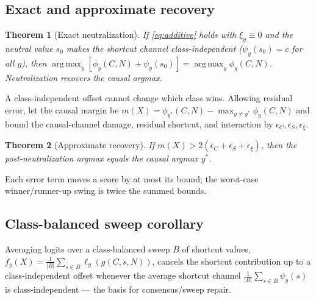 \documentclass[11pt]{article}
\newtheorem{theorem}{Theorem}
\newcommand{\argmax}{\operatorname*{arg\,max}}
\begin{document}
\subsection{Exact and approximate recovery}
\begin{theorem}[Exact neutralization]
If \eqref{eq:additive} holds with $\xi_y\equiv 0$ and the neutral value $s_0$ makes
the shortcut channel class-independent ($\psi_y(s_0)=c$ for all $y$), then
$\argmax_y[\phi_y(C,N)+\psi_y(s_0)] = \argmax_y \phi_y(C,N)$. Neutralization recovers
the causal argmax.
\end{theorem}
A class-independent offset cannot change which class wins. Allowing residual error,
let the causal margin be $m(X)=\phi_{y^*}(C,N)-\max_{y\ne y^*}\phi_y(C,N)$ and bound
the causal-channel damage, residual shortcut, and interaction by
$\epsilon_C,\epsilon_S,\epsilon_\xi$.
\begin{theorem}[Approximate recovery]
If $m(X) > 2(\epsilon_C+\epsilon_S+\epsilon_\xi)$, then the post-neutralization
argmax equals the causal argmax $y^*$.
\end{theorem}
Each error term moves a score by at most its bound; the worst-case winner/runner-up
swing is twice the summed bounds.

\subsection{Class-balanced sweep corollary}
Averaging logits over a class-balanced sweep $B$ of shortcut values,
$\bar f_y(X)=\frac{1}{|B|}\sum_{s\in B}\ell_y(g(C,s,N))$, cancels the shortcut
contribution up to a class-independent offset whenever the average shortcut channel
$\frac{1}{|B|}\sum_{s\in B}\psi_y(s)$ is class-independent --- the basis for
consensus/sweep repair.
\end{document}
